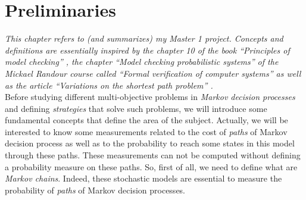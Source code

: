 \chapter{Preliminaries}
\textit{This chapter refers to (and summarizes) my Master 1 project. Concepts and definitions are essentially inspired by the chapter 10 of the book ``Principles of model checking'' \cite{PMC}, the chapter ``Model checking probabilistic systems'' of the Mickael Randour course called ``Formal verification of computer systems'' \cite{MRV} as well as the article ``Variations on the shortest path problem'' \cite{DBLP:journals/corr/RandourRS14a}.} \\

Before studying different multi-objective problems in \textit{Markov decision
processes} and defining \textit{strategies} that solve such problems, we will introduce some fundamental concepts that define the area of the subject.
Actually, we will be interested to know some measurements related to the cost of \textit{paths} of Markov decision process as well as to the probability to reach some states in this model through these paths.
These measurements can not be computed without defining a probability measure on these paths.
So, first of all, we need to define what are \textit{Markov chains}. Indeed, these
stochastic models are essential to measure the probability of \textit{paths} of Markov decision processes.

